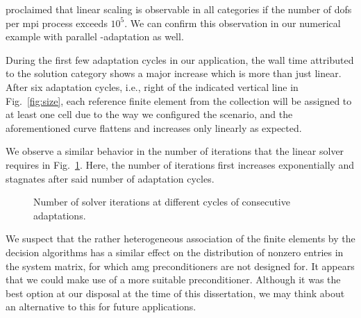 \textcite{bangerth2012} proclaimed that linear scaling is observable in all categories if the number of \glspl{dof} per \gls{mpi} process exceeds $10^5$. We can confirm this observation in our numerical example with parallel \hp-adaptation as well.

During the first few adaptation cycles in our application, the wall time attributed to the solution category shows a major increase which is more than just linear. After six adaptation cycles, i.e., right of the indicated vertical line in Fig.~\ref{fig:size}, each reference finite element from the collection will be assigned to at least one cell due to the way we configured the scenario, and the aforementioned curve flattens and increases only linearly as expected.

We observe a similar behavior in the number of iterations that the linear solver requires in Fig.~\ref{fig:solveriterations}. Here, the number of iterations first increases exponentially and stagnates after said number of adaptation cycles.

\begin{figure}
\centering

\caption[Number of solver iterations at different cycles of consecutive adaptations.]{Number of solver iterations at different cycles of consecutive adaptations.}
\label{fig:solveriterations}
\end{figure}



We suspect that the rather heterogeneous association of the finite elements by the decision algorithms
has a similar effect on the distribution of nonzero entries in the system matrix, for which \gls{amg} preconditioners are not designed for. It appears that we could make use of a more suitable preconditioner. Although it was the best option at our disposal at the time of this dissertation, we may think about an alternative to this for future applications.

